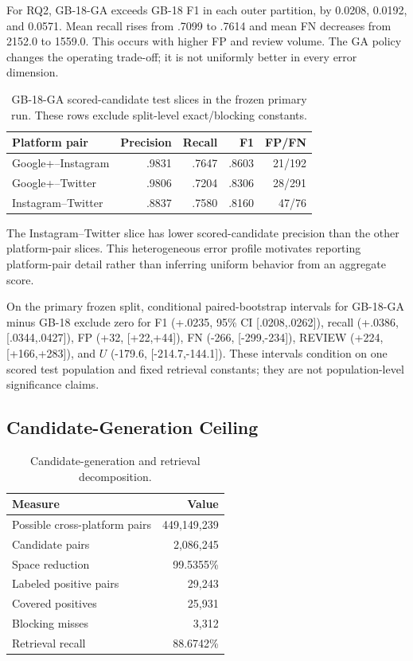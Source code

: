 \documentclass[conference]{IEEEtran}
\begin{document}
For RQ2, GB-18-GA exceeds GB-18 F1 in each outer partition, by 0.0208, 0.0192, and 0.0571. Mean recall rises from .7099 to .7614 and mean FN decreases from 2152.0 to 1559.0. This occurs with higher FP and review volume. The GA policy changes the operating trade-off; it is not uniformly better in every error dimension.

\begin{table}[!t]
\caption{GB-18-GA scored-candidate test slices in the frozen primary run. These rows exclude split-level exact/blocking constants.}
\label{tab:platform}
\centering\footnotesize
\begin{tabular}{lrrrr}
\toprule
Platform pair & Precision & Recall & F1 & FP/FN\\
\midrule
Google+--Instagram & .9831 & .7647 & .8603 & 21/192\\
Google+--Twitter & .9806 & .7204 & .8306 & 28/291\\
Instagram--Twitter & .8837 & .7580 & .8160 & 47/76\\
\bottomrule
\end{tabular}
\end{table}

The Instagram--Twitter slice has lower scored-candidate precision than the other platform-pair slices. This heterogeneous error profile motivates reporting platform-pair detail rather than inferring uniform behavior from an aggregate score.

On the primary frozen split, conditional paired-bootstrap intervals for GB-18-GA minus GB-18 exclude zero for F1 (+.0235, 95\% CI [.0208,.0262]), recall (+.0386, [.0344,.0427]), FP (+32, [+22,+44]), FN (-266, [-299,-234]), REVIEW (+224, [+166,+283]), and $U$ (-179.6, [-214.7,-144.1]). These intervals condition on one scored test population and fixed retrieval constants; they are not population-level significance claims.

\subsection{Candidate-Generation Ceiling}
\begin{table}[!t]
\caption{Candidate-generation and retrieval decomposition.}
\label{tab:retrieval}
\centering\small
\begin{tabular}{lr}
\toprule
Measure & Value\\
\midrule
Possible cross-platform pairs & 449,149,239\\
Candidate pairs & 2,086,245\\
Space reduction & 99.5355\%\\
Labeled positive pairs & 29,243\\
Covered positives & 25,931\\
Blocking misses & 3,312\\
Retrieval recall & 88.6742\%\\
\bottomrule
\end{tabular}
\end{table}
\end{document}
